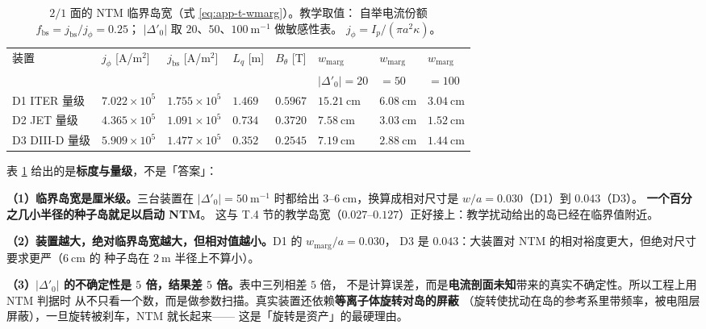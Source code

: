 \begin{table}[htbp]
  \centering
  \caption{$2/1$ 面的 NTM 临界岛宽（式 \eqref{eq:app-t-wmarg}）。教学取值：
    自举电流份额 $f_{\mathrm{bs}}=j_{\mathrm{bs}}/j_\phi=0.25$；
    $|\Delta'_0|$ 取 $20$、$50$、$100\ \mathrm{m^{-1}}$ 做敏感性表。
    $j_\phi=I_p/(\pi a^2\kappa)$。}
  \label{tab:app-t-ntm}
  \begin{tabular}{@{}p{2.6cm}p{2.0cm}p{2.0cm}p{1.0cm}p{1.3cm}p{2.2cm}p{1.4cm}p{1.4cm}@{}}
    \toprule
    装置 & $j_\phi$ [A/m$^2$] & $j_{\mathrm{bs}}$ [A/m$^2$] & $L_q$ [m] & $B_\theta$ [T] & $w_{\mathrm{marg}}$ & $w_{\mathrm{marg}}$ & $w_{\mathrm{marg}}$ \\
    & & & & & $|\Delta'_0|=20$ & $=50$ & $=100$ \\
    \midrule
    D1 ITER 量级 & $7.022\times10^{5}$ & $1.755\times10^{5}$ & $1.469$ & $0.5967$ & $15.21\ \mathrm{cm}$ & $6.08\ \mathrm{cm}$ & $3.04\ \mathrm{cm}$ \\
    D2 JET 量级 & $4.365\times10^{5}$ & $1.091\times10^{5}$ & $0.734$ & $0.3720$ & $7.58\ \mathrm{cm}$ & $3.03\ \mathrm{cm}$ & $1.52\ \mathrm{cm}$ \\
    D3 DIII-D 量级 & $5.909\times10^{5}$ & $1.477\times10^{5}$ & $0.352$ & $0.2545$ & $7.19\ \mathrm{cm}$ & $2.88\ \mathrm{cm}$ & $1.44\ \mathrm{cm}$ \\
    \bottomrule
  \end{tabular}
\end{table}

表 \ref{tab:app-t-ntm} 给出的是\textbf{标度与量级}，不是「答案」：

\textbf{（1）临界岛宽是厘米级。}三台装置在 $|\Delta'_0|=50\ \mathrm{m^{-1}}$ 时都给出
$3$--$6\ \mathrm{cm}$，换算成相对尺寸是 $w/a=0.030$（D1）到 $0.043$（D3）。
\textbf{一个百分之几小半径的种子岛就足以启动 NTM}。
这与 T.4 节的教学岛宽（$0.027$--$0.127$）正好接上：教学扰动给出的岛已经在临界值附近。

\textbf{（2）装置越大，绝对临界岛宽越大，但相对值越小。}D1 的 $w_{\mathrm{marg}}/a=0.030$，
D3 是 $0.043$：大装置对 NTM 的相对裕度更大，但绝对尺寸要求更严（$6\ \mathrm{cm}$ 的
种子岛在 $2\ \mathrm{m}$ 半径上不算小）。

\textbf{（3）$|\Delta'_0|$ 的不确定性是 $5$ 倍，结果差 $5$ 倍。}表中三列相差 $5$ 倍，
不是计算误差，而是\textbf{电流剖面未知}带来的真实不确定性。所以工程上用 NTM 判据时
从不只看一个数，而是做参数扫描。真实装置还依赖\textbf{等离子体旋转对岛的屏蔽}
（旋转使扰动在岛的参考系里带频率，被电阻层屏蔽），一旦旋转被刹车，NTM 就长起来——
这是「旋转是资产」的最硬理由。

